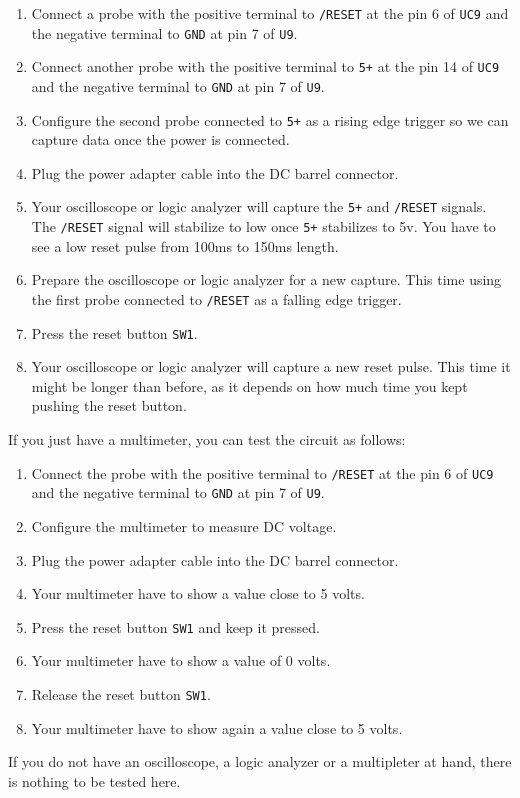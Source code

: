 \begin{enumerate}
  \item Connect a probe with the positive terminal to {\tt /RESET} at the pin 6 of {\tt UC9} and the negative terminal to {\tt GND} at pin 7 of {\tt U9}.
  \item Connect another probe with the positive terminal to {\tt 5+} at the pin 14 of {\tt UC9} and the negative terminal to {\tt GND} at pin 7 of {\tt U9}.
  \item Configure the second probe connected to {\tt 5+} as a rising edge trigger so we can capture data once the power is connected.
  \item Plug the power adapter cable into the DC barrel connector.
  \item Your oscilloscope or logic analyzer will capture the {\tt 5+} and {\tt /RESET} signals. The {\tt /RESET} signal will stabilize to low once {\tt 5+} stabilizes to 5v. You have to see a low reset pulse from 100ms to 150ms length.
  \item Prepare the oscilloscope or logic analyzer for a new capture. This time using the first probe connected to {\tt /RESET} as a falling edge trigger.
  \item Press the reset button {\tt SW1}.
  \item Your oscilloscope or logic analyzer will capture a new reset pulse. This time it might be longer than before, as it depends on how much time you kept pushing the reset button.
\end{enumerate}

If you just have a multimeter, you can test the circuit as follows:

\begin{enumerate}
  \item Connect the probe with the positive terminal to {\tt /RESET} at the pin 6 of {\tt UC9} and the negative terminal to {\tt GND} at pin 7 of {\tt U9}.
  \item Configure the multimeter to measure DC voltage.
  \item Plug the power adapter cable into the DC barrel connector.
  \item Your multimeter have to show a value close to 5 volts.
  \item Press the reset button {\tt SW1} and keep it pressed.
  \item Your multimeter have to show a value of 0 volts.
  \item Release the reset button {\tt SW1}.
  \item Your multimeter have to show again a value close to 5 volts.
\end{enumerate}

If you do not have an oscilloscope, a logic analyzer or a multipleter at hand, there is nothing to be tested here.

